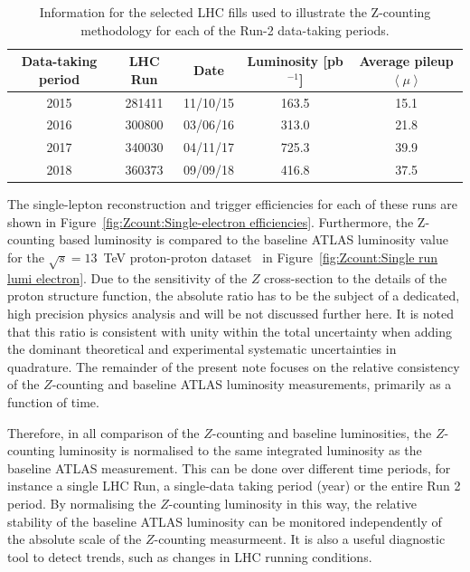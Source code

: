 \begin{table}[!htb]
	\centering
	\begin{tabular}{@{}ccccc@{}}
		\toprule
		Data-taking period & LHC Run & Date     & Luminosity [pb$^{-1}$] & Average pileup $\left< \mu \right>$ \\ \midrule
		2015               & 281411  & 11/10/15 & 163.5         & 15.1           \\
		2016               & 300800  & 03/06/16 & 313.0         & 21.8           \\
		2017               & 340030  & 04/11/17 & 725.3         & 39.9           \\
		2018               & 360373  & 09/09/18 & 416.8         & 37.5           \\ \bottomrule
	\end{tabular}
	\caption{Information for the selected LHC fills used to illustrate the Z-counting methodology for each of the Run-2 data-taking periods.}
	\label{tab:Zcount:Example runs}
\end{table}

The single-lepton reconstruction and trigger efficiencies for each of these runs are shown in Figure~\ref{fig:Zcount:Single-electron efficiencies}. Furthermore, the Z-counting based luminosity is compared to the baseline ATLAS luminosity value for the $\sqrt{s}=13$~TeV proton-proton dataset~\cite{ATLAS-CONF-2019-021} in Figure~\ref{fig:Zcount:Single run lumi electron}. Due to the sensitivity of the $Z$ cross-section to the details of the proton structure function, the absolute ratio has to be the subject of a dedicated, high precision physics analysis and will be not discussed further here. It is noted that this ratio is consistent with unity within the total uncertainty when adding the dominant theoretical and experimental systematic uncertainties in quadrature. The remainder of the present note focuses on the relative consistency of the $Z$-counting and baseline ATLAS luminosity measurements, primarily as a function of time.

Therefore, in all comparison of the $Z$-counting and baseline luminosities, the $Z$-counting luminosity is normalised to the same integrated luminosity as the baseline ATLAS measurement. This can be done over different time periods, for instance a single LHC Run, a single-data taking period (year) or the entire Run 2 period. By normalising the $Z$-counting luminosity in this way, the relative stability of the baseline ATLAS luminosity can be monitored independently of the absolute scale of the $Z$-counting measurmeent. It is also a useful diagnostic tool to detect trends, such as changes in LHC running conditions.

